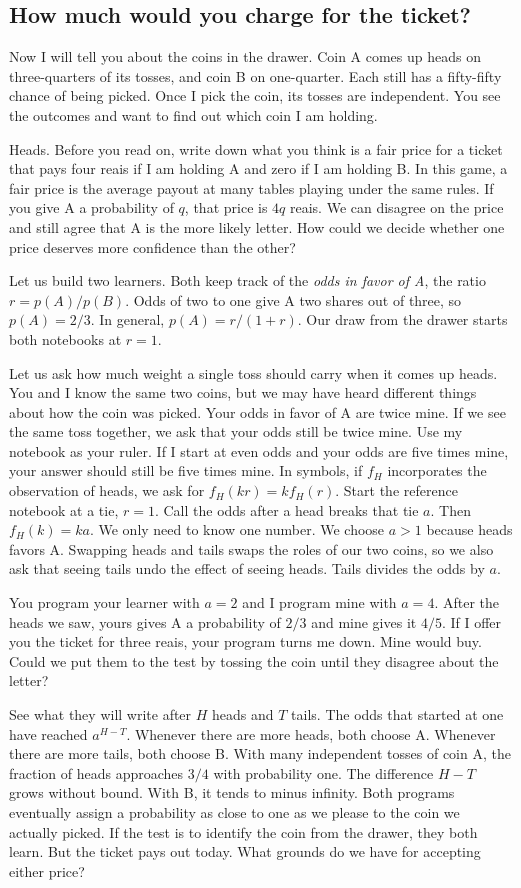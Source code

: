 \documentclass[12pt,oneside]{article}
\newcommand{\secao}[1]{\Needspace{5.2\baselineskip}\subsection*{#1}}
\begin{document}
\secao{How much would you charge for the ticket?}
Now I will tell you about the coins in the drawer. Coin A comes up heads on three-quarters of its tosses, and coin B on one-quarter. Each still has a fifty-fifty chance of being picked. Once I pick the coin, its tosses are independent. You see the outcomes and want to find out which coin I am holding.

Heads. Before you read on, write down what you think is a fair price for a ticket that pays four reais if I am holding A and zero if I am holding B. In this game, a fair price is the average payout at many tables playing under the same rules. If you give A a probability of \(q\), that price is \(4q\) reais. We can disagree on the price and still agree that A is the more likely letter. How could we decide whether one price deserves more confidence than the other?

Let us build two learners. Both keep track of the \emph{odds in favor of A}, the ratio \(r=p(A)/p(B)\). Odds of two to one give A two shares out of three, so \(p(A)=2/3\). In general, \(p(A)=r/(1+r)\). Our draw from the drawer starts both notebooks at \(r=1\).

Let us ask how much weight a single toss should carry when it comes up heads. You and I know the same two coins, but we may have heard different things about how the coin was picked. Your odds in favor of A are twice mine. If we see the same toss together, we ask that your odds still be twice mine. Use my notebook as your ruler. If I start at even odds and your odds are five times mine, your answer should still be five times mine. In symbols, if $f_H$ incorporates the observation of heads, we ask for $f_H(kr)=kf_H(r)$. Start the reference notebook at a tie, $r=1$. Call the odds after a head breaks that tie $a$. Then $f_H(k)=ka$. We only need to know one number. We choose \(a>1\) because heads favors A. Swapping heads and tails swaps the roles of our two coins, so we also ask that seeing tails undo the effect of seeing heads. Tails divides the odds by \(a\).

You program your learner with \(a=2\) and I program mine with \(a=4\). After the heads we saw, yours gives A a probability of \(2/3\) and mine gives it \(4/5\). If I offer you the ticket for three reais, your program turns me down. Mine would buy. Could we put them to the test by tossing the coin until they disagree about the letter?

See what they will write after \(H\) heads and \(T\) tails. The odds that started at one have reached \(a^{H-T}\). Whenever there are more heads, both choose A. Whenever there are more tails, both choose B. With many independent tosses of coin A, the fraction of heads approaches \(3/4\) with probability one. The difference \(H-T\) grows without bound. With B, it tends to minus infinity. Both programs eventually assign a probability as close to one as we please to the coin we actually picked. If the test is to identify the coin from the drawer, they both learn. But the ticket pays out today. What grounds do we have for accepting either price?
\end{document}
